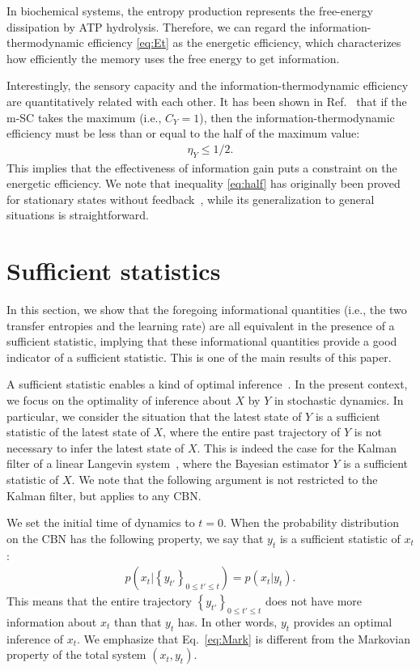 \documentclass[%
 reprint,
 amsmath,amssymb,
 aps,
]{revtex4-1}
\newcommand{\balign}[1]{\begin{align} #1 \end{align}}
\newcommand{\eref}[1]{Eq.~\eqref{#1}}
\theoremstyle{plain}
\begin{document}
In biochemical systems, the entropy production represents the free-energy dissipation by ATP hydrolysis. Therefore, we can regard the information-thermodynamic efficiency \eqref{eq:Et} as the energetic efficiency, which characterizes how efficiently the memory uses the free energy to get information. 

Interestingly, the sensory capacity and the information-thermodynamic efficiency are quantitatively related with each other. It has been shown in Ref.~\cite{Hartich2016} that if the m-SC takes the maximum (i.e., $C_Y=1$), then the information-thermodynamic efficiency must be less than or equal to the half of the maximum value:
\balign{
\eta_{Y}\leq1/2. \label{eq:half}
}
This implies that the effectiveness of information gain puts a constraint on the energetic efficiency. We note that inequality \eqref{eq:half} has originally been proved for stationary states without feedback~\cite{Hartich2016}, while its generalization to general situations is straightforward.
\section{\label{sec:ss}Sufficient statistics}
In this section, we show that the foregoing informational quantities (i.e., the two transfer entropies and the learning rate) are all equivalent in the presence of a sufficient statistic, implying that these informational quantities provide a good indicator of a sufficient statistic. This is one of the main results of this paper. 

A sufficient statistic enables a kind of optimal inference~\cite{Cover2006}.  In the present context, we focus on the optimality of inference about $X$ by $Y$ in stochastic dynamics.  In particular, we consider the situation that the latest state of $Y$ is a sufficient statistic of the latest state of $X$, where the entire past trajectory of $Y$ is not necessary to infer the latest state of $X$. This is indeed the case for the Kalman filter of a linear Langevin system~\cite{Astrom}, where the Bayesian estimator $Y$ is a sufficient statistic of $X$.
We note that the following argument is not restricted to the Kalman filter, but applies to any CBN.

We set the initial time of dynamics to $t=0$. When the probability distribution on the CBN has the following property, we say that $y_t$ is a sufficient statistic of $x_t$:
\balign{
p(x_t|\left\{y_{t'}\right\}_{0\leq t'\leq t})=p(x_t|y_t). \label{eq:Mark}
}
This means that the entire trajectory $\left\{ y_{t'} \right\}_{0\leq t' \leq t}$ does not have more information about $x_t$ than that $y_t$ has. In other words, $y_t$ provides an optimal inference of $x_t$. We emphasize that \eref{eq:Mark} is different from the Markovian property of the total system $(x_t, y_t)$.  
\end{document}
